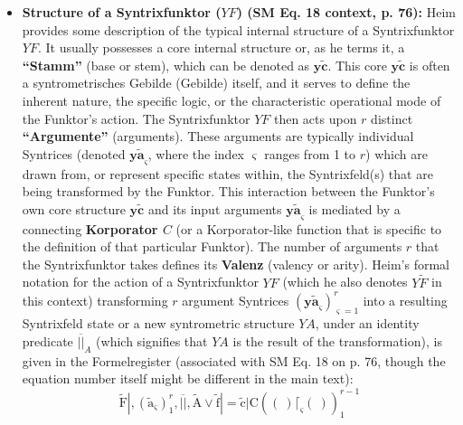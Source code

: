\documentclass[12pt]{article}
\newcommand{\q}[1]{\enquote{#1}}
\newcommand{\syntrix}{\bm{y\widetilde{a}}}
\newcommand{\syntrometrischesGebilde}{\text{Gebilde}}
\newcommand{\syntrixfunktor}{YF}
\begin{document}
\begin{itemize}
    \item \textbf{Structure of a Syntrixfunktor (\(\syntrixfunktor\)) (SM Eq. 18 context, p. 76):}
    Heim provides some description of the typical internal structure of a Syntrixfunktor \( \syntrixfunktor \). It usually possesses a core internal structure or, as he terms it, a \textbf{\q{Stamm}} (base or stem), which can be denoted as \( \mathbf{y\widetilde{c}} \). This core \( \mathbf{y\widetilde{c}} \) is often a syntrometrisches Gebilde (\(\syntrometrischesGebilde\)) itself, and it serves to define the inherent nature, the specific logic, or the characteristic operational mode of the Funktor's action. The Syntrixfunktor \( \syntrixfunktor \) then acts upon \( r \) distinct \textbf{\q{Argumente}} (arguments). These arguments are typically individual Syntrices (denoted \( \syntrix_\varsigma \), where the index \( \varsigma \) ranges from 1 to \( r \)) which are drawn from, or represent specific states within, the Syntrixfeld(s) that are being transformed by the Funktor. This interaction between the Funktor's own core structure \( \mathbf{y\widetilde{c}} \) and its input arguments \( \syntrix_\varsigma \) is mediated by a connecting \textbf{Korporator \( C \)} (or a Korporator-like function that is specific to the definition of that particular Funktor). The number of arguments \( r \) that the Syntrixfunktor takes defines its \textbf{Valenz} (valency or arity).
    Heim's formal notation for the action of a Syntrixfunktor \( \syntrixfunktor \) (which he also denotes \( Y\tilde{F} \) in this context) transforming \( r \) argument Syntrices \( (\syntrix_\varsigma)^r_{\varsigma=1} \) into a resulting Syntrixfeld state or a new syntrometric structure \( YA \), under an identity predicate \( \overline{||}_A \) (which signifies that \(YA\) is the result of the transformation), is given in the Formelregister (associated with SM Eq. 18 on p. 76, though the equation number itself might be different in the main text):
    \begin{equation}
    \tilde{\mathrm{F}}|, \left( \tilde{\mathrm{a}}_\varsigma \right)_1^r, \overline{||}, \tilde{\mathrm{A}} \lor \tilde{\mathrm{f}}| = \tilde{\mathrm{c}}| \mathrm{C} \left( (\ ) \lceil_\varsigma (\ ) \right)_1^{r-1}
    \label{eq:original_syntrixfunktor_action}
    \end{equation}

\end{itemize}
\end{document}

